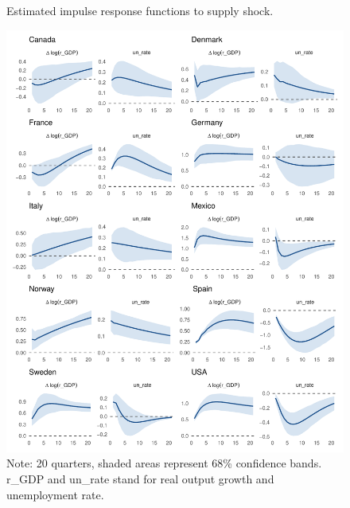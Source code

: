 \documentclass[12pt, a4paper]{article}
\begin{document}
\newpage
\begin{figure}[H]
    \caption{Estimated impulse response functions to supply shock.}
    \label{fig:var_impulses_supply}
    \centering
    \includegraphics[width=\textwidth, height=0.9\textheight, keepaspectratio]{Figures/all_supply.pdf}
    \caption*{Note: 20 quarters, shaded areas represent 68\% confidence bands. r\_GDP and un\_rate stand for real output growth and unemployment rate.}
\end{figure}
\end{document}
